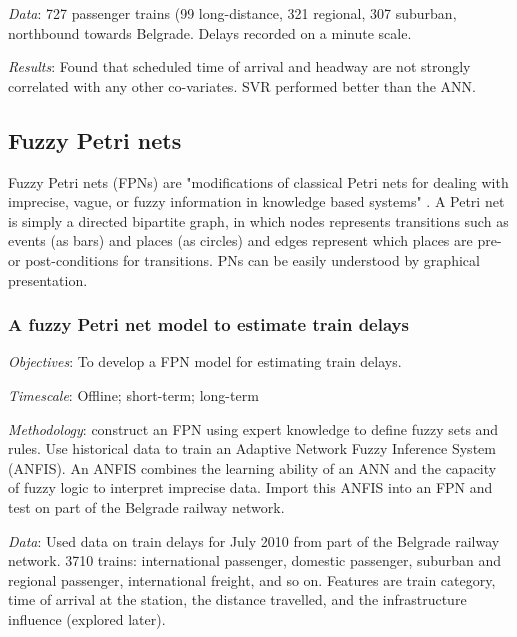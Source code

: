 \documentclass{article}
\begin{document}
\smallskip

\textit{Data}:  727 passenger trains (99 long-distance, 321 regional, 307 suburban, northbound towards Belgrade. Delays recorded on a minute scale.

\smallskip

\textit{Results}: Found that scheduled time of arrival and headway are not strongly correlated with any other co-variates. SVR performed better than the ANN.

\subsection{Fuzzy Petri nets}

Fuzzy Petri nets (FPNs) are "modifications of classical Petri nets for dealing with imprecise, vague, or fuzzy information in knowledge based systems" \cite{liu_et_al_2017}. A Petri net is simply a directed bipartite graph, in which nodes represents transitions such as events (as bars) and places (as circles) and edges represent which places are pre- or post-conditions for transitions. PNs can be easily understood by graphical presentation.

\subsubsection{A fuzzy Petri net model to estimate train delays \cite{milinkovic_et_al_2013}}

\textit{Objectives}: To develop a FPN model for estimating train delays.

\smallskip

\textit{Timescale}: Offline; short-term; long-term

\smallskip

\textit{Methodology}: construct an FPN using expert knowledge to define fuzzy sets and rules. Use historical data to train an Adaptive Network Fuzzy Inference System (ANFIS). An ANFIS combines the learning ability of an ANN and the capacity of fuzzy logic to interpret imprecise data. Import this ANFIS into an FPN and test on part of the Belgrade railway network. 

\smallskip

\textit{Data}: Used data on train delays for July 2010 from part of the Belgrade railway network.  3710 trains: international passenger, domestic passenger, suburban and regional passenger, international freight, and so on. Features are train category, time of arrival at the station, the distance travelled, and the infrastructure influence (explored later). 
\end{document}
